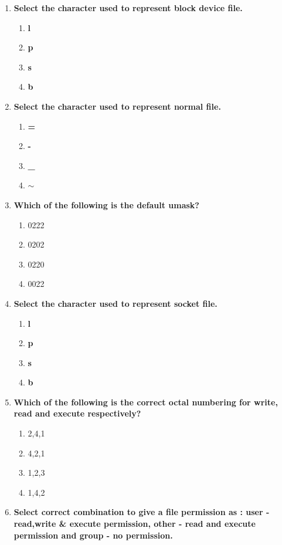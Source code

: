 \begin{flushleft}
\begin{enumerate}
		\item \textbf{Select the character used to represent block device file.}
		\begin{enumerate}[label=(\alph*)]
			\item \textbf{l}   
			\item \textbf{p}
			\item \textbf{s}
			\item \textbf{b}   %
		\end{enumerate}
		\bigskip
		\bigskip
		\item \textbf{Select the character used to represent normal file.}
		\begin{enumerate}[label=(\alph*)]
			\item \textbf{=}
			\item \textbf{-} %
			\item \textbf{\_}
			\item \textbf{$\sim$} 
		\end{enumerate}
		\bigskip
		\bigskip
		\item \textbf{Which of the following is the default umask?}
		\begin{enumerate}[label=(\alph*)]
			\item 0222
			\item 0202
			\item 0220
			\item 0022  %
		\end{enumerate}	
		\bigskip
		\bigskip
		\item \textbf{Select the character used to represent socket file.}
		\begin{enumerate}[label=(\alph*)]
			\item \textbf{l}   
			\item \textbf{p}
			\item \textbf{s}  %
			\item \textbf{b}  
		\end{enumerate}
		\bigskip
		\bigskip
		\item \textbf{Which of the following is the correct octal numbering for write, read and execute respectively?}
		\begin{enumerate}[label=(\alph*)]
			\item 2,4,1  %
			\item 4,2,1   
			\item 1,2,3
			\item 1,4,2
		\end{enumerate}
		\bigskip
		\bigskip
		\item \textbf{Select correct combination to give a file permission as : user - read,write \& execute permission, other - read and execute permission and group - no permission.}

\end{enumerate}
\end{flushleft}
